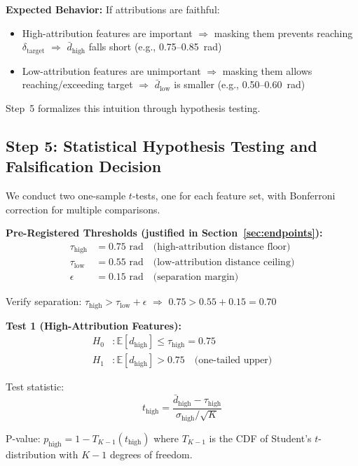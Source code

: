 \textbf{Expected Behavior:} If attributions are faithful:
\begin{itemize}
\item High-attribution features are important $\Rightarrow$ masking them prevents reaching $\delta_{\text{target}}$ $\Rightarrow$ $\bar{d}_{\text{high}}$ falls short (e.g., 0.75--0.85~rad)
\item Low-attribution features are unimportant $\Rightarrow$ masking them allows reaching/exceeding target $\Rightarrow$ $\bar{d}_{\text{low}}$ is smaller (e.g., 0.50--0.60~rad)
\end{itemize}

Step~5 formalizes this intuition through hypothesis testing.

\subsection{Step 5: Statistical Hypothesis Testing and Falsification Decision}

We conduct two one-sample $t$-tests, one for each feature set, with Bonferroni correction for multiple comparisons.

\textbf{Pre-Registered Thresholds (justified in Section~\ref{sec:endpoints}):}
\begin{align}
\tau_{\text{high}} &= 0.75 \text{~rad} \quad \text{(high-attribution distance floor)} \\
\tau_{\text{low}} &= 0.55 \text{~rad} \quad \text{(low-attribution distance ceiling)} \\
\epsilon &= 0.15 \text{~rad} \quad \text{(separation margin)}
\end{align}

Verify separation: $\tau_{\text{high}} > \tau_{\text{low}} + \epsilon$ $\Rightarrow$ $0.75 > 0.55 + 0.15 = 0.70$ \checkmark

\textbf{Test 1 (High-Attribution Features):}
\begin{align}
H_0&: \mathbb{E}[d_{\text{high}}] \leq \tau_{\text{high}} = 0.75 \\
H_1&: \mathbb{E}[d_{\text{high}}] > 0.75 \quad \text{(one-tailed upper)}
\end{align}

Test statistic:
\begin{equation}
t_{\text{high}} = \frac{\bar{d}_{\text{high}} - \tau_{\text{high}}}{\sigma_{\text{high}} / \sqrt{K}}
\end{equation}

P-value: $p_{\text{high}} = 1 - T_{K-1}(t_{\text{high}})$ where $T_{K-1}$ is the CDF of Student's $t$-distribution with $K-1$ degrees of freedom.

